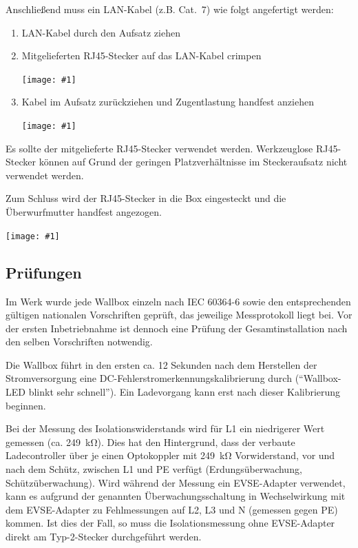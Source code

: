 \documentclass[a4paper,10pt]{article}
\newcommand{\hint}[1]{\begin{tcolorbox}[colback=boxgray,colframe=black,coltext=
white,title=Hinweis]#1\end{tcolorbox}}
\newcommand{\gfx}[1]{\texttt{[image: \#1]}}
\begin{document}
\begin{multicols*}{2}
	\columnbreak
	Anschließend muss ein LAN-Kabel (z.B. Cat.~7) wie folgt
	angefertigt werden:
	\begin{enumerate}
		\item LAN-Kabel durch den Aufsatz ziehen
		\item Mitgelieferten RJ45-Stecker auf das LAN-Kabel crimpen

		\gfx{./img_warp2/resized/warp2_rj45_1_600}
		\item Kabel im Aufsatz zurückziehen und Zugentlastung handfest anziehen

		\gfx{./img_warp2/resized/warp2_rj45_2_600}
	\end{enumerate}

	\hint{Es sollte der mitgelieferte RJ45-Stecker verwendet werden. Werkzeuglose RJ45-Stecker können auf Grund der geringen
	Platzverhältnisse im Steckeraufsatz nicht verwendet werden.}
	Zum Schluss wird der RJ45-Stecker in die Box eingesteckt und die Überwurfmutter
	handfest angezogen.

	\gfx{./img_warp2/resized/warp2_ethernet4_600} %

	\subsection{Prüfungen}\label{tests}
	Im Werk wurde jede Wallbox einzeln nach IEC 60364-6 sowie den entsprechenden gültigen
	nationalen Vorschriften geprüft, das jeweilige Messprotokoll liegt bei.
	Vor der ersten Inbetriebnahme ist dennoch eine Prüfung der Gesamtinstallation
	nach den selben Vorschriften notwendig.

	Die Wallbox führt in den ersten ca. 12 Sekunden nach dem Herstellen der Stromversorgung
	eine DC-Fehlerstromerkennungskalibrierung durch (\enquote{Wallbox-LED blinkt sehr schnell}).
	Ein Ladevorgang kann erst nach dieser Kalibrierung beginnen.

	Bei der Messung des Isolationswiderstands wird für L1 ein niedrigerer Wert
	gemessen (ca. \SI{249}{\kilo\ohm}). Dies hat den Hintergrund, dass
	der verbaute Ladecontroller über je einen Optokoppler mit
	\SI{249}{\kilo\ohm} Vorwiderstand, vor und nach dem Schütz, zwischen L1 und
	PE verfügt (Erdungsüberwachung, Schützüberwachung). Wird während der Messung ein EVSE-Adapter verwendet,
	kann es aufgrund der genannten Überwachungsschaltung in Wechselwirkung mit dem EVSE-Adapter zu Fehlmessungen
	auf L2, L3 und N (gemessen gegen PE) kommen. Ist dies der Fall, so muss die Isolationsmessung
	ohne EVSE-Adapter direkt am Typ-2-Stecker durchgeführt werden.


\end{multicols*}
\end{document}
